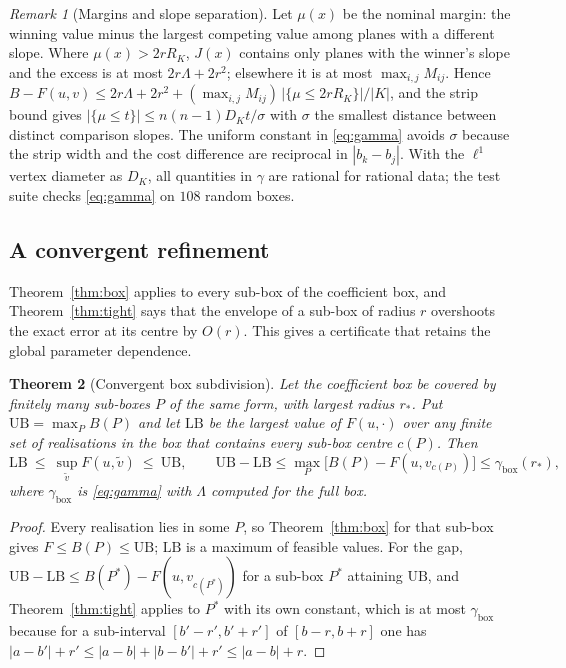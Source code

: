 \documentclass[11pt]{article}
\newtheorem{theorem}{Theorem}
\theoremstyle{remark}
\newtheorem{remark}[theorem]{Remark}
\newcommand{\Lam}{\Lambda}
\begin{document}
\begin{remark}[Margins and slope separation]\label{rem:margin}
Let $\mu(x)$ be the nominal margin: the winning value minus the largest
competing value among planes with a different slope. Where $\mu(x)>2rR_K$,
$J(x)$ contains only planes with the winner's slope and the excess is at most
$2r\Lam+2r^2$; elsewhere it is at most $\max_{i,j}M_{ij}$. Hence
$B-F(u,v)\le2r\Lam+2r^2+(\max_{i,j}M_{ij})\,|\{\mu\le2rR_K\}|/|K|$, and the
strip bound gives $|\{\mu\le t\}|\le n(n-1)D_Kt/\sigma$ with $\sigma$ the
smallest distance between distinct comparison slopes. The uniform constant in
\eqref{eq:gamma} avoids $\sigma$ because the strip width and the cost
difference are reciprocal in $|b_k-b_j|$. With the $\ell^1$ vertex diameter as
$D_K$, all quantities in $\gamma$ are rational for rational data; the test suite
checks \eqref{eq:gamma} on $108$ random boxes.
\end{remark}

\subsection{A convergent refinement}
Theorem~\ref{thm:box} applies to every sub-box of the coefficient box, and
Theorem~\ref{thm:tight} says that the envelope of a sub-box of radius $r$
overshoots the exact error at its centre by $O(r)$. This gives a certificate
that retains the global parameter dependence.

\begin{theorem}[Convergent box subdivision]\label{thm:refine}
Let the coefficient box be covered by finitely many sub-boxes $P$ of the same
form, with largest radius $r_*$. Put $\mathrm{UB}=\max_PB(P)$ and let
$\mathrm{LB}$ be the largest value of $F(u,\cdot)$ over any finite set of
realisations in the box that contains every sub-box centre $c(P)$. Then
\[
 \mathrm{LB}\ \le\ \sup_{\widetilde v}F(u,\widetilde v)\ \le\ \mathrm{UB},
 \qquad
 \mathrm{UB}-\mathrm{LB}\le\max_P\big[B(P)-F(u,v_{c(P)})\big]\le\gamma_{\mathrm{box}}(r_*),
\]
where $\gamma_{\mathrm{box}}$ is \eqref{eq:gamma} with $\Lam$ computed for the
full box.
\end{theorem}
\begin{proof}
Every realisation lies in some $P$, so Theorem~\ref{thm:box} for that sub-box
gives $F\le B(P)\le\mathrm{UB}$; $\mathrm{LB}$ is a maximum of feasible values.
For the gap, $\mathrm{UB}-\mathrm{LB}\le B(P^*)-F(u,v_{c(P^*)})$ for a sub-box
$P^*$ attaining $\mathrm{UB}$, and Theorem~\ref{thm:tight} applies to $P^*$
with its own constant, which is at most $\gamma_{\mathrm{box}}$ because for a
sub-interval $[b'-r',b'+r']$ of $[b-r,b+r]$ one has
$|a-b'|+r'\le|a-b|+|b-b'|+r'\le|a-b|+r$.
\end{proof}
\end{document}
